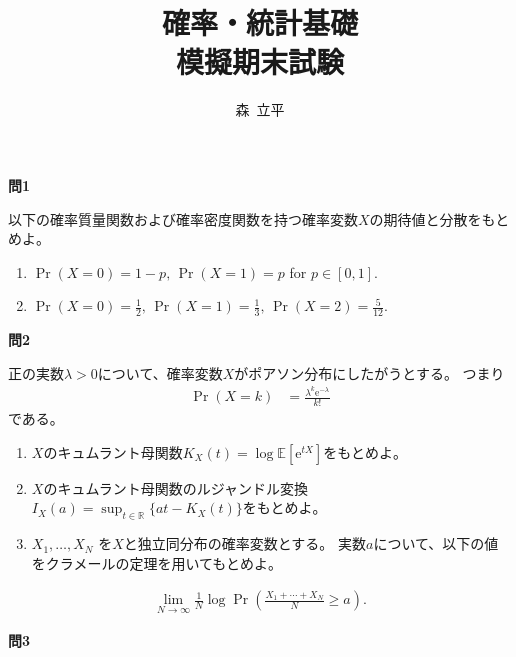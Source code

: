 \documentclass[lualatex,ja=standard,a4paper]{bxjsarticle}
\title{確率・統計基礎\\
模擬期末試験}
\author{森~立平}
\date{}
\theoremstyle{definition}
\theoremstyle{remark}
\begin{document}
\maketitle


\vspace{1em}
{\noindent\large\bfseries 問1}

\vspace{1em}
以下の確率質量関数および確率密度関数を持つ確率変数$X$の期待値と分散をもとめよ。

\vspace{1em}
\begin{enumerate}[label=(\arabic*)]
\setlength{\itemsep}{1em}
\item
$\Pr(X=0)=1-p,\,\Pr(X=1)=p$ for $p\in[0,1]$.
\item
$\Pr(X=0)=\frac12,\,\Pr(X=1)=\frac13,\,\Pr(X=2)=\frac{5}{12}$.
\end{enumerate}

\vspace{1em}
{\noindent\large\bfseries 問2}

\vspace{1em}
正の実数$\lambda>0$について、確率変数$X$がポアソン分布にしたがうとする。
つまり
\begin{align*}
\Pr(X = k) &=  \frac{\lambda^k\mathrm{e}^{-\lambda}}{k!}
\end{align*}
である。
\vspace{1em}
\begin{enumerate}[label=(\arabic*)]
\setlength{\itemsep}{1em}
\item $X$のキュムラント母関数$K_X(t)=\log\mathbb{E}[\mathrm{e}^{tX}]$をもとめよ。
\item $X$のキュムラント母関数のルジャンドル変換$I_X(a) = \sup_{t\in\mathbb{R}}\{at - K_X(t)\}$をもとめよ。
\item $X_1,\dotsc,X_N$ を$X$と独立同分布の確率変数とする。
実数$a$について、以下の値をクラメールの定理を用いてもとめよ。
\end{enumerate}
\begin{align*}
\lim_{N\to\infty}\frac1N\log\Pr\left(\frac{X_1+\dotsb+X_N}{N} \ge a\right).
\end{align*}


\newpage
{\noindent\large\bfseries 問3}
\end{document}
